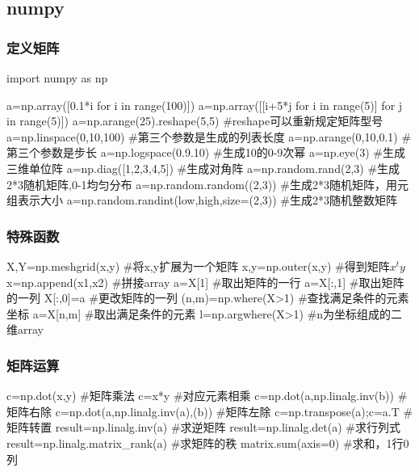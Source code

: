\documentclass{article}
\begin{document}
    \subsection{numpy}
      \subsubsection{定义矩阵}
        \begin{codeblock}[language=python, caption={Define matrices using numpy}]
          import numpy as np

          a=np.array([0.1*i for i in range(100)])
          a=np.array([[i+5*j for i in range(5)] for j in range(5)])
          a=np.arange(25).reshape(5,5) #reshape可以重新规定矩阵型号
          a=np.linspace(0,10,100) #第三个参数是生成的列表长度
          a=np.arange(0,10,0.1) #第三个参数是步长
          a=np.logspace(0.9.10) #生成10的0-9次幂
          a=np.eye(3) #生成三维单位阵
          a=np.diag([1,2,3,4,5]) #生成对角阵
          a=np.random.rand(2,3) #生成2*3随机矩阵,0-1均匀分布
          a=np.random.random((2,3)) #生成2*3随机矩阵，用元组表示大小
          a=np.random.randint(low,high,size=(2,3)) #生成2*3随机整数矩阵
        \end{codeblock}

      \subsubsection{特殊函数}  
        \begin{codeblock}[language=python, caption={Advanced operations in numpy}]
          X,Y=np.meshgrid(x,y) #将x,y扩展为一个矩阵
          x,y=np.outer(x,y) #得到矩阵$x^{t}y$
          x=np.append(x1,x2) #拼接array
          a=X[1] #取出矩阵的一行
          a=X[:,1] #取出矩阵的一列
          X[:,0]=a #更改矩阵的一列
          (n,m)=np.where(X>1) #查找满足条件的元素坐标
          a=X[n,m] #取出满足条件的元素
          l=np.argwhere(X>1) #n为坐标组成的二维array
        \end{codeblock}

      \subsubsection{矩阵运算}
        \begin{codeblock}[language=python, caption={calculation of matrix}]
          c=np.dot(x,y) #矩阵乘法
          c=x*y #对应元素相乘
          c=np.dot(a,np.linalg.inv(b)) #矩阵右除
          c=np.dot(a,np.linalg.inv(a),(b)) #矩阵左除
          c=np.transpose(a);c=a.T #矩阵转置
          result=np.linalg.inv(a) #求逆矩阵
          result=np.linalg.det(a) #求行列式
          result=np.linalg.matrix_rank(a) #求矩阵的秩
          matrix.sum(axis=0) #求和，1行0列
        \end{codeblock}
\end{document}
